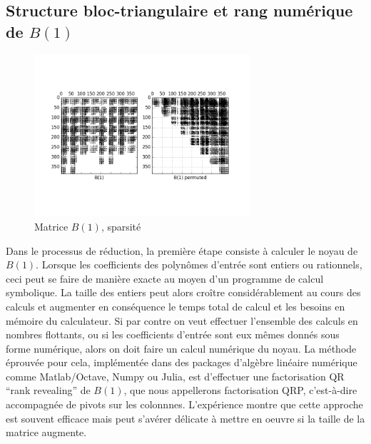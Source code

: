 \documentclass{standalone}
\begin{document}
\subsection{Structure bloc-triangulaire et rang numérique de $B(1)$}

\begin{figure}
  \caption{Matrice $B(1)$, sparsité}
  \label{fig:B1_sparsity}
  \includegraphics[width=8cm]{../png/sparsity.png}
\end{figure}
Dans le processus de réduction, la première étape consiste à calculer le noyau de $B(1)$. Lorsque les coefficients des polynômes d'entrée sont entiers ou rationnels, ceci peut se faire de manière exacte au moyen d'un programme de calcul symbolique. La taille des entiers peut alors croître considérablement au cours des calculs et augmenter en conséquence le temps total de calcul et les besoins en mémoire du calculateur. Si par contre on veut effectuer l'ensemble des calculs en nombres flottants, ou si les coefficients d'entrée sont eux mêmes donnés sous forme numérique, alors on doit faire un calcul numérique du noyau. 
La méthode éprouvée pour cela, implémentée dans des packages d'algèbre linéaire numérique comme Matlab/Octave, Numpy ou Julia, est d'effectuer une factorisation QR ``rank revealing'' de $B(1)$, que nous appellerons factorisation QRP, c'est-à-dire accompagnée de pivots sur les colonnnes. L'expérience montre que cette approche est souvent efficace mais peut s'avérer délicate à mettre en oeuvre si la taille de la matrice augmente. 
\end{document}
